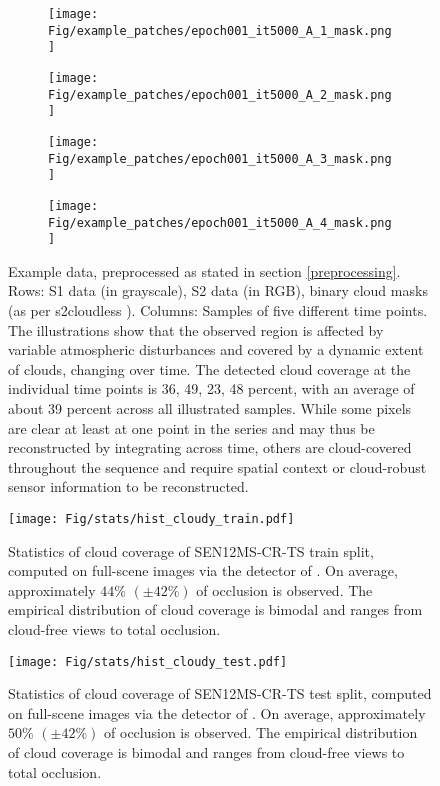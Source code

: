 \documentclass[journal]{IEEEtran}
\begin{document}
\begin{figure*}[h!tb]
\begin{subfigure}[b]{0.19\linewidth}
    \texttt{[image: Fig/example\_patches/epoch001\_it5000\_A\_1\_mask.png]}
  \end{subfigure}
    \begin{subfigure}[b]{0.19\linewidth}
    \texttt{[image: Fig/example\_patches/epoch001\_it5000\_A\_2\_mask.png]}
  \end{subfigure}
      \begin{subfigure}[b]{0.19\linewidth}
    \texttt{[image: Fig/example\_patches/epoch001\_it5000\_A\_3\_mask.png]}
  \end{subfigure}
      \begin{subfigure}[b]{0.19\linewidth}
    \texttt{[image: Fig/example\_patches/epoch001\_it5000\_A\_4\_mask.png]}
  \end{subfigure}
  \caption{Example data, preprocessed as stated in section \ref{preprocessing}. Rows: S1 data (in grayscale), S2 data (in RGB), binary cloud masks (as per s2cloudless \cite{Zupanc}). Columns: Samples of five different time points. The illustrations show that the observed region is affected by variable atmospheric disturbances and covered by a dynamic extent of clouds, changing over time. The detected cloud coverage at the individual time points is 36, 49, 23, 48 percent, with an average of about 39 percent across all illustrated samples. While some pixels are clear at least at one point in the series and may thus be reconstructed by integrating across time, others are cloud-covered throughout the sequence and require spatial context or cloud-robust sensor information to be reconstructed.
  }
  \label{fig:sample_patches_masks}
\end{figure*}

\begin{figure}[h!tb]
    \texttt{[image: Fig/stats/hist\_cloudy\_train.pdf]}
    \caption{Statistics of cloud coverage of SEN12MS-CR-TS train split, computed on full-scene images via the detector of \cite{Zupanc}. On average, approximately $44 \%$ $(\pm 42 \%)$ of occlusion is observed. The empirical distribution of cloud coverage is bimodal and ranges from cloud-free views to total occlusion.}
    \label{fig:cloud_coverage_train}
\end{figure}

\begin{figure}[h!tb]
    \texttt{[image: Fig/stats/hist\_cloudy\_test.pdf]}
    \caption{Statistics of cloud coverage of SEN12MS-CR-TS test split, computed on full-scene images via the detector of \cite{Zupanc}. On average, approximately $50 \%$ $(\pm 42 \%)$ of occlusion is observed. The empirical distribution of cloud coverage is bimodal and ranges from cloud-free views to total occlusion.}
    \label{fig:cloud_coverage_test}
\end{figure}
\end{document}
